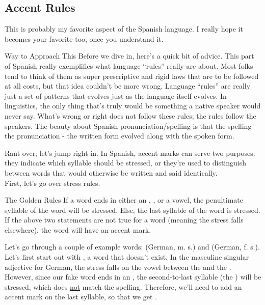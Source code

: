 \subsection{Accent Rules}
\label{subsec:accents}
This is probably my favorite aspect of the Spanish language. I really hope it becomes your favorite too, once you understand it.\\

\begin{conf}{Way to Approach This}
	Before we dive in, here's a quick bit of advice. This part of Spanish really exemplifies what language ``rules'' really are about. Most folks tend to think of them as super prescriptive and rigid laws that are to be followed at all costs, but that idea couldn't be more wrong. Language ``rules'' are really just a set of patterns that evolves just as the language itself evolves. In linguistics, the only thing that's truly  would be something a native speaker would never say. What's wrong or right does not follow these rules; the rules follow the speakers. The beauty about Spanish pronunciation/spelling is that the spelling  the pronunciation - the written form evolved along with the spoken form.  
\end{conf}

Rant over; let's jump right in. In Spanish, accent marks can serve two purposes: they indicate which syllable should be stressed, or they're used to distinguish between words that would otherwise be written and said identically. \\

First, let's go over stress rules.\\

\begin{conf}{The Golden Rules}
If a word ends in either an , , or a vowel, the penultimate syllable of the word will be stressed. Else, the last syllable of the word is stressed. If the above two statements are not true for a word (meaning the stress falls elsewhere), the word will have an accent mark.
\end{conf}

Let's go through a couple of example words:  (German, m. s.) and  (German, f. s.).\\

Let's first start out with \sout{}, a word that doesn't exist. In the masculine singular adjective for German, the stress falls on the vowel between the  and the . However, since our fake word  \sout{} ends in an , the second-to-last syllable (the ) will be stressed, which does \underline{not} match the spelling. Therefore, we'll need to add an accent mark on the last syllable, so that we get . \\

